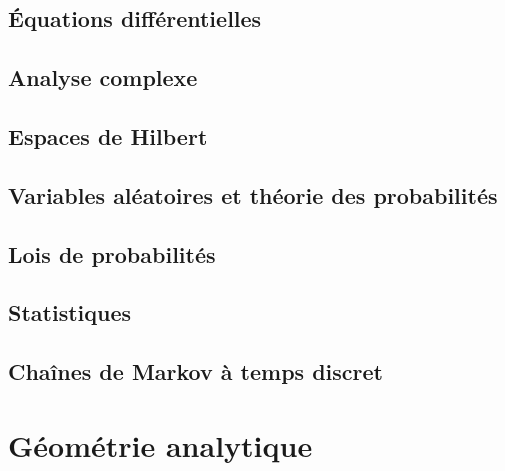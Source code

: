 \chapter{Équations différentielles}


\chapter{Analyse complexe}


\chapter{Espaces de Hilbert}



\chapter{Variables aléatoires et théorie des probabilités}


\chapter{Lois de probabilités}


\chapter{Statistiques}


\chapter{Chaînes de Markov à temps discret}


%

\let\oldCorrectionRepertory\CorrectionRepertory
\renewcommand{\CorrectionRepertory}{GeomAnal/}


\part{Géométrie analytique}


